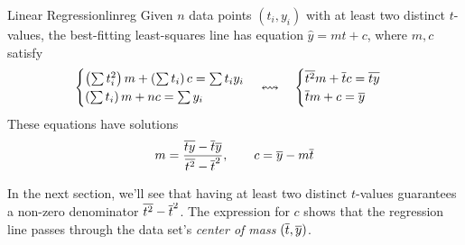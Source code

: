 \begin{thm}{Linear Regression}{linreg}
	Given $n$ data points $(t_i,y_i)$ with at least two distinct $t$-values, the best-fitting least-squares line has equation $\hat y=mt+c$, where $m,c$ satisfy
	\[
		\begin{cases}
			\left(\sum t_i^2\right)m+\left(\sum t_i\right)c=\sum t_iy_i\\
			\left(\sum t_i\right)m+nc=\sum y_i
		\end{cases}
		\leftrightsquigarrow \quad
		\begin{cases}
			\overline{t^2}m+\overline{t}c=\overline{ty}\\
			\overline{t}m+c=\overline{y}\\
		\end{cases}
	\]
	These equations have solutions
	\[
		m=\frac{\overline{ty}-\overline{t} \overline{y}}{\overline{t^2}-\overline{t}^2},\qquad c=\overline{y}-m\overline{t}
	\]
\end{thm}

In the next section, we'll see that having at least two distinct $t$-values guarantees a non-zero denominator $\smash[t]{\overline{t^2}-\overline{t}^2}$. The expression for $c$ shows that the regression line passes through the data set's \emph{center of mass} $(\overline{t},\overline{y})$.


\pagebreak[3]


